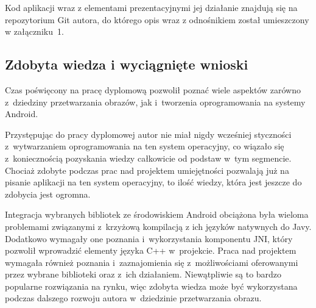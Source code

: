 \par

Kod aplikacji wraz z elementami prezentacyjnymi jej działanie znajdują się na repozytorium Git autora, do którego opis wraz z odnośnikiem został umieszczony w załączniku~1. 


\subsection{Zdobyta wiedza i wyciągnięte wnioski}


Czas poświęcony na pracę dyplomową pozwolił poznać wiele aspektów zarówno z~dziedziny przetwarzania obrazów, jak i~tworzenia oprogramowania na systemy Android. 

\par

Przystępując do pracy dyplomowej autor nie miał nigdy wcześniej styczności z~wytwarzaniem oprogramowania na ten system operacyjny, co wiązało się z~koniecznością pozyskania wiedzy całkowicie od podstaw w~tym segmencie. Chociaż zdobyte podczas prac nad projektem umiejętności pozwalają już na pisanie aplikacji na ten system operacyjny, to ilość wiedzy, która jest jeszcze do zdobycia jest ogromna.

\par

Integracja wybranych bibliotek ze środowiskiem Android obciążona była wieloma problemami związanymi z~krzyżową kompilacją z ich języków natywnych do Javy. Dodatkowo wymagały one poznania i~wykorzystania komponentu JNI, który pozwolił wprowadzić elementy języka C++ w~projekcie. Praca nad projektem wymagała również poznania i~zaznajomienia się z~możliwościami oferowanymi przez wybrane biblioteki oraz z~ich działaniem. Niewątpliwie są to bardzo popularne rozwiązania na rynku, więc zdobyta wiedza może być wykorzystana podczas dalszego rozwoju autora w~dziedzinie przetwarzania obrazu. 

\par

